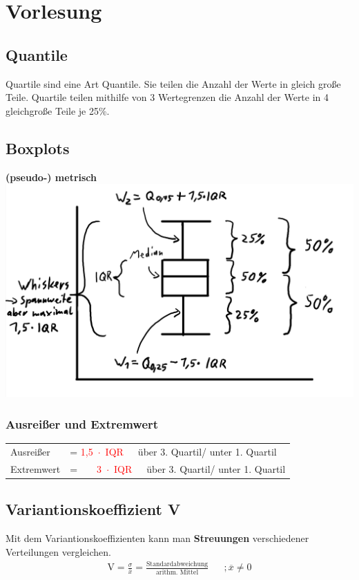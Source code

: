 
\section{Vorlesung}


\subsection{Quantile}
Quartile sind eine Art Quantile. Sie teilen die Anzahl der Werte in gleich große Teile. Quartile teilen mithilfe von 3 Wertegrenzen die Anzahl der Werte in 4 gleichgroße Teile je 25\%.



\subsection{Boxplots}
  \small{\textbf{\textrightarrow (pseudo-) metrisch}}
\vspace{1cm}
  \includegraphics[scale=0.25]{./img/Boxplot.png}

\subsubsection{Ausreißer und Extremwert}
\begin{tabular}{l|l}
  Ausreißer & = \textcolor{red}{1,5~$\cdot$~IQR}~~~über 3. Quartil/ unter 1. Quartil\\
  Extremwert& =\textcolor{red}{~~~~3~$\cdot$~IQR}~~~über 3. Quartil/ unter 1. Quartil
\end{tabular}



\subsection{Variantionskoeffizient V}
  Mit dem Variantionskoeffizienten kann man \textbf{Streuungen} verschiedener Verteilungen vergleichen.
\begin{align*}
  \textrm{V} = \frac{\sigma}{\overline{x}} = \frac{\textrm{Standardabweichung}}{\textrm{arithm. Mittel}} && ;\overline{x}\neq 0
\end{align*}

